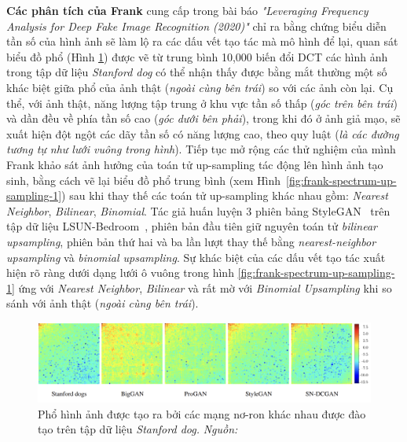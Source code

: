 \textbf{Các phân tích của Frank}\cite{Frank2020LeveragingFA} cung cấp trong bài báo \textit{"Leveraging Frequency Analysis for Deep Fake Image Recognition (2020)"} chỉ ra bằng chứng biểu diễn tần số của hình ảnh sẽ làm lộ ra các dấu vết tạo tác mà mô hình để lại, quan sát biểu đồ phổ (Hình \ref{fig:dct-spectra-1}) được vẽ từ trung bình 10,000 biến đổi DCT các hình ảnh trong tập dữ liệu \textit{Stanford dog} có thể nhận thấy được bằng mắt thường một số khác biệt giữa phổ của ảnh thật (\textit{ngoài cùng bên trái}) so với các ảnh còn lại. Cụ thể, với ảnh thật, năng lượng tập trung ở khu vực tần số thấp (\textit{góc trên bên trái}) và dần đều về phía tần số cao (\textit{góc dưới bên phải}), trong khi đó ở ảnh giả mạo, sẽ xuất hiện đột ngột các dãy tần số có năng lượng cao, theo quy luật (\textit{là các đường tương tự như lưới vuông trong hình}). Tiếp tục mở rộng các thử nghiệm của mình Frank khảo sát ảnh hưởng của toán tử \gls{up-sampling} tác động lên hình ảnh tạo sinh, bằng cách vẽ lại biểu đồ phổ trung bình (xem Hình~\ref{fig:frank-spectrum-up-sampling-1}) sau khi thay thế các toán tử \gls{up-sampling} khác nhau gồm: \textit{Nearest Neighbor}, \textit{Bilinear}, \textit{Binomial}. Tác giả huấn luyện 3 phiên bảng StyleGAN~\cite{karras2019style} trên tập dữ liệu LSUN-Bedroom~\cite{Yu2015LSUNCO}, phiên bản đầu tiên giữ nguyên toán tử \textit{bilinear upsampling}, phiên bản thứ hai và ba lần lượt thay thế bằng \textit{nearest-neighbor upsampling} và \textit{binomial upsampling}.
Sự khác biệt của các dấu vết tạo tác xuất hiện rõ ràng dưới dạng lưới ô vuông trong hình \ref{fig:frank-spectrum-up-sampling-1} ứng với \textit{Nearest Neighbor}, \textit{Bilinear} và rất mờ với \textit{Binomial Upsampling} khi so sánh với ảnh thật (\textit{ngoài cùng bên trái}).
%
\begin{figure}[ht!]
	\centering
	\includegraphics[width=1.0\linewidth]{Images/Stanford-dog-data-set-DCT-spectra.png}
	\begin{minipage}{0.9\linewidth}
		\caption{Phổ hình ảnh được tạo ra bởi các mạng nơ-ron khác nhau được đào tạo trên tập dữ liệu \textit{Stanford dog.} \textit{Nguồn: \cite{Frank2020LeveragingFA}}}
		\label{fig:dct-spectra-1}
	\end{minipage}
\end{figure}
